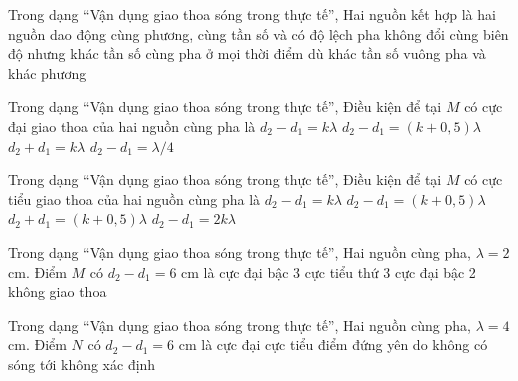 \begin{ex}
Trong dạng “Vận dụng giao thoa sóng trong thực tế”, Hai nguồn kết hợp là hai nguồn dao động
\choice
{\True cùng phương, cùng tần số và có độ lệch pha không đổi}
{cùng biên độ nhưng khác tần số}
{cùng pha ở mọi thời điểm dù khác tần số}
{vuông pha và khác phương}
\end{ex}

\begin{ex}
Trong dạng “Vận dụng giao thoa sóng trong thực tế”, Điều kiện để tại $M$ có cực đại giao thoa của hai nguồn cùng pha là
\choice
{\True $d_2-d_1=k\lambda$}
{$d_2-d_1=(k+0,5)\lambda$}
{$d_2+d_1=k\lambda$}
{$d_2-d_1=\lambda/4$}
\end{ex}

\begin{ex}
Trong dạng “Vận dụng giao thoa sóng trong thực tế”, Điều kiện để tại $M$ có cực tiểu giao thoa của hai nguồn cùng pha là
\choice
{$d_2-d_1=k\lambda$}
{\True $d_2-d_1=(k+0,5)\lambda$}
{$d_2+d_1=(k+0,5)\lambda$}
{$d_2-d_1=2k\lambda$}
\end{ex}

\begin{ex}
Trong dạng “Vận dụng giao thoa sóng trong thực tế”, Hai nguồn cùng pha, $\lambda=2$ cm. Điểm $M$ có $d_2-d_1=6$ cm là
\choice
{\True cực đại bậc 3}
{cực tiểu thứ 3}
{cực đại bậc 2}
{không giao thoa}
\end{ex}

\begin{ex}
Trong dạng “Vận dụng giao thoa sóng trong thực tế”, Hai nguồn cùng pha, $\lambda=4$ cm. Điểm $N$ có $d_2-d_1=6$ cm là
\choice
{cực đại}
{\True cực tiểu}
{điểm đứng yên do không có sóng tới}
{không xác định}
\end{ex}

